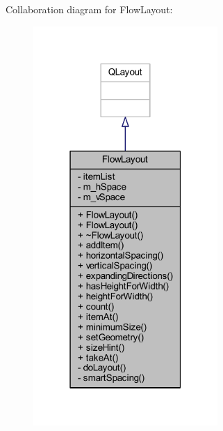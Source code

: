 Collaboration diagram for Flow\+Layout\+:
\nopagebreak
\begin{figure}[H]
\begin{center}
\leavevmode
\includegraphics[width=199pt]{class_flow_layout__coll__graph}
\end{center}
\end{figure}
